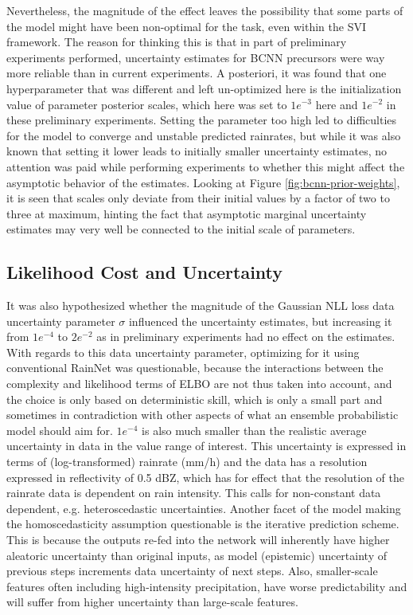 Nevertheless, the magnitude of the effect leaves the possibility that some parts of the model might have been non-optimal for the task, even within the SVI framework. The reason for thinking this is that in part of preliminary experiments performed, uncertainty estimates for BCNN precursors were way more reliable than in current experiments. A posteriori, it was found that one hyperparameter that was different and left un-optimized here is the initialization value of parameter posterior scales, which here was set to $1e^{-3}$ here and $1e^{-2}$ in these preliminary experiments. Setting the parameter too high led to difficulties for the model to converge and unstable predicted rainrates, but while it was also known that setting it lower leads to initially smaller uncertainty estimates, no attention was paid while performing experiments to whether this might affect the asymptotic behavior of the estimates. Looking at Figure \ref{fig:bcnn-prior-weights}, it is seen that scales only deviate from their initial values by a factor of two to three at maximum, hinting the fact that asymptotic marginal uncertainty estimates may very well be connected to the initial scale of parameters. 

\subsection*{Likelihood Cost and Uncertainty}

It was also hypothesized whether the magnitude of the Gaussian NLL loss data uncertainty parameter $\sigma$ influenced the uncertainty estimates, but increasing it from $1e^{-4}$ to $2e^{-2}$ as in preliminary experiments had no effect on the estimates. 
With regards to this data uncertainty parameter, optimizing for it using conventional RainNet was questionable, because the interactions between the complexity and likelihood terms of ELBO are not thus taken into account, and the choice is only based on deterministic skill, which is only a small part and sometimes in contradiction with other aspects of what an ensemble probabilistic model should aim for. $1e^{-4}$ is also much smaller than the realistic average uncertainty in data in the value range of interest. This uncertainty is expressed in terms of (log-transformed) rainrate (mm/h) and the data has a resolution expressed in reflectivity of 0.5 dBZ, which has for effect that the resolution of the rainrate data is dependent on rain intensity. This calls for non-constant data dependent, e.g. heteroscedastic uncertainties. Another facet of the model making the homoscedasticity assumption questionable is the iterative prediction scheme. This is because the outputs re-fed into the network will inherently have higher aleatoric uncertainty than original inputs, as model (epistemic) uncertainty of previous steps increments data uncertainty of next steps. Also, smaller-scale features often including high-intensity precipitation, have worse predictability and will suffer from higher uncertainty than large-scale features.

